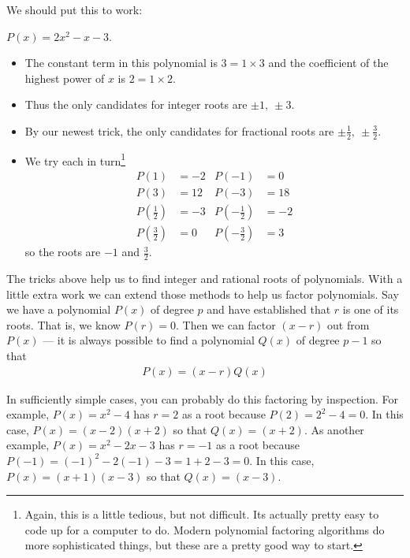 We should put this to work:
\begin{eg}
$P(x)=2x^2-x-3$.

\soln
\begin{itemize}
 \item The constant term in this polynomial is $3=1\times 3$ and the coefficient
of the highest power of $x$ is $2=1\times 2$.
\item Thus the only candidates for integer roots are $\pm 1,\ \pm 3$.
\item By our newest trick, the only candidates for fractional
roots are $\pm \frac{1}{2},\ \pm\frac{3}{2}$.
\item We try each in turn\footnote{Again, this is a little tedious, but not
difficult. Its actually pretty easy to code up for a computer to do. Modern
polynomial factoring algorithms do more sophisticated things, but these are a
pretty good way to start.}
\begin{align*}
P(1)&=-2 & P(-1)&=0 \\
P(3)&=12 & P(-3)&=18\\
P\left(\tfrac{1}{2}\right) &= -3 &
P\left(-\tfrac{1}{2}\right) &= -2 \\
P\left(\tfrac{3}{2}\right) &= 0 &
P\left(-\tfrac{3}{2}\right) &= 3
\end{align*}
so the roots are $-1$ and $\frac{3}{2}$.
\end{itemize}
\end{eg}

The tricks above help us to find integer and rational roots of polynomials. With a little
extra work we can extend those methods to help us factor polynomials. Say we have a
polynomial $P(x)$ of degree $p$ and have established that $r$ is one of its
roots. That is, we know $P(r)=0$. Then we can factor $(x-r)$ out from
$P(x)$ --- it is always possible to find a polynomial $Q(x)$ of degree $p-1$ so
that
\begin{align*}
  P(x) = (x-r)Q(x)
\end{align*}

In sufficiently simple cases, you can probably do this factoring by
inspection. For example, $P(x)=x^2-4$ has $r=2$ as a root because
$P(2)=2^2-4=0$.  In this case, $P(x)=(x-2)(x+2)$ so that
$Q(x)=(x+2)$. As another example, $P(x)=x^2-2x-3$ has $r=-1$ as a root
because $P(-1)=(-1)^2-2(-1)-3=1+2-3=0$. In this case,
$P(x)=(x+1)(x-3)$ so that $Q(x)=(x-3)$.

